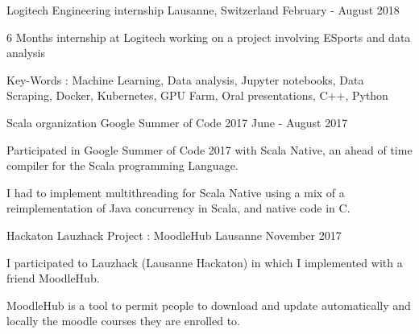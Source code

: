 


\begin{cventries}
	

\cventry
{Logitech} %
{Engineering internship} %
{Lausanne, Switzerland} %
{February - August 2018} %
{ %
	\begin{cvitems}
		\item {6 Months internship at Logitech working on a project involving ESports and data analysis}
		\item {Key-Words : Machine Learning, Data analysis, Jupyter notebooks, Data Scraping, Docker, Kubernetes, GPU Farm, Oral presentations, C++, Python}
	\end{cvitems}
}
	

\cventry
{Scala organization} %
{Google Summer of Code 2017} %
{} %
{June - August 2017} %
{ %
\begin{cvitems}
\item {Participated in Google Summer of Code 2017 with Scala Native, an ahead of time compiler for the Scala programming Language.}
\item {I had to implement multithreading for Scala Native using a mix of a reimplementation of Java concurrency in Scala, and native code in C.}
\end{cvitems}
}


\cventry
{Hackaton} %
{Lauzhack Project : MoodleHub} %
{Lausanne} %
{November 2017} %
{ %
	\begin{cvitems}
		\item {I participated to Lauzhack (Lausanne Hackaton) in which I implemented with a friend MoodleHub.}
		\item {MoodleHub is a tool to permit people to download and update automatically and locally the moodle courses they are enrolled to.}
	\end{cvitems}
}


\end{cventries}
